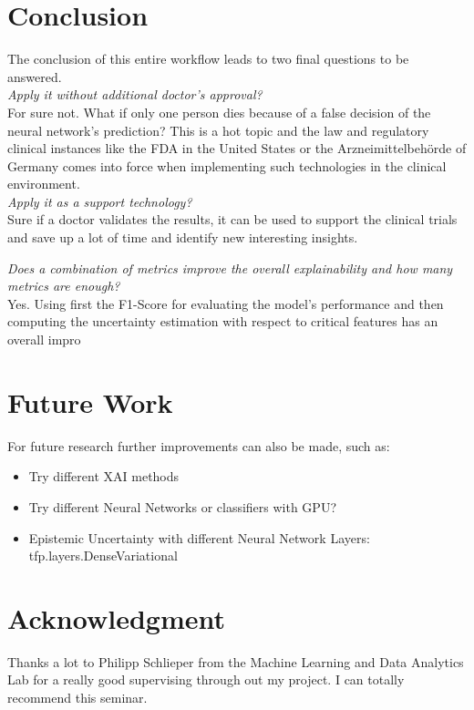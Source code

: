 \documentclass[journal]{IEEEtran}
\begin{document}
 
\section{Conclusion}
\noindent The conclusion of this entire workflow leads to two final questions to be answered. \\

\textit{Apply it without additional doctor’s approval?} \\

For sure not. What if only one person dies because of a false
decision of the neural network's prediction? This is a hot topic and the law and regulatory clinical instances like the FDA in the United States or the Arzneimittelbehörde of Germany comes into force when implementing such technologies in the clinical environment. \\

\textit{Apply it as a support technology?} \\

Sure if a doctor validates the results, it can be used to support the clinical trials and save up a lot of time and identify new interesting insights.

\textit{Does a combination of metrics improve the overall explainability and how many metrics are enough?} \\
Yes. Using first the F1-Score for evaluating the model's performance and then computing the uncertainty estimation with respect to critical features has an overall impro


\section{Future Work}
\noindent For future research further improvements can also be made, such as: \\

\begin{itemize}
	\item Try different XAI methods
	\item Try different Neural Networks or classifiers with GPU?
	\item Epistemic Uncertainty with different Neural Network Layers: tfp.layers.DenseVariational
\end{itemize}


\section*{Acknowledgment}
\noindent Thanks a lot to Philipp Schlieper from the Machine Learning and Data Analytics Lab for a really good supervising through out my project. I can totally recommend this seminar.
\end{document}
